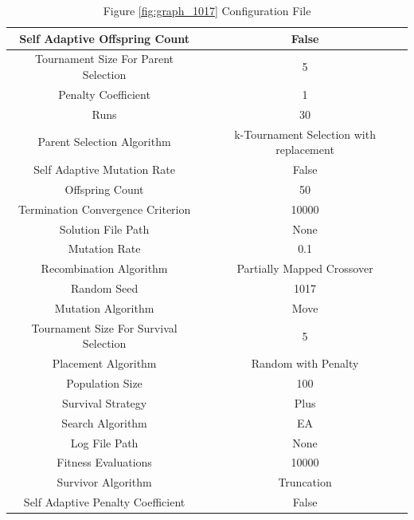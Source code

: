 \documentclass{standalone}
\begin{document}
\begin{table}[!htb]
	\centering
	\caption{Figure \ref{fig:graph_1017} Configuration File}
	\label{tab:graph_1017}
	\begin{tabular}{| c | c |}
		\hline
		Self Adaptive Offspring Count		& False		 \\
		\hline
		Tournament Size For Parent Selection		& 5		 \\
		\hline
		Penalty Coefficient		& 1		 \\
		\hline
		Runs		& 30		 \\
		\hline
		Parent Selection Algorithm		& k-Tournament Selection with replacement		 \\
		\hline
		Self Adaptive Mutation Rate		& False		 \\
		\hline
		Offspring Count		& 50		 \\
		\hline
		Termination Convergence Criterion		& 10000		 \\
		\hline
		Solution File Path		& None		 \\
		\hline
		Mutation Rate		& 0.1		 \\
		\hline
		Recombination Algorithm		& Partially Mapped Crossover		 \\
		\hline
		Random Seed		& 1017		 \\
		\hline
		Mutation Algorithm		& Move		 \\
		\hline
		Tournament Size For Survival Selection		& 5		 \\
		\hline
		Placement Algorithm		& Random with Penalty		 \\
		\hline
		Population Size		& 100		 \\
		\hline
		Survival Strategy		& Plus		 \\
		\hline
		Search Algorithm		& EA		 \\
		\hline
		Log File Path		& None		 \\
		\hline
		Fitness Evaluations		& 10000		 \\
		\hline
		Survivor Algorithm		& Truncation		 \\
		\hline
		Self Adaptive Penalty Coefficient		& False		 \\
		\hline
	\end{tabular}
\end{table}
\end{document}
